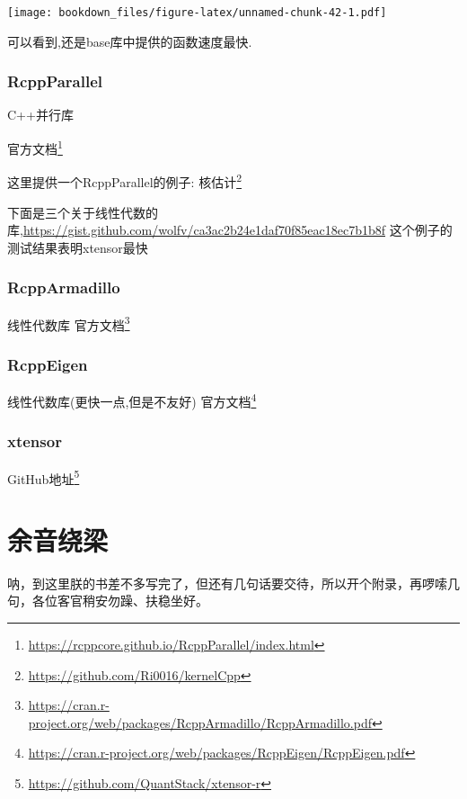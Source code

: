 \documentclass[]{ctexbook}
\renewcommand{\href}[2]{#2\footnote{\url{#1}}}
\begin{document}
\texttt{[image: bookdown\_files/figure-latex/unnamed-chunk-42-1.pdf]}

可以看到,还是base库中提供的函数速度最快.

\hypertarget{rcppparallel}{%
\subsection{RcppParallel}\label{rcppparallel}}

C++并行库

\href{https://rcppcore.github.io/RcppParallel/index.html}{官方文档}

这里提供一个RcppParallel的例子:
\href{https://github.com/Ri0016/kernelCpp}{核估计}

下面是三个关于线性代数的库,\url{https://gist.github.com/wolfv/ca3ac2b24e1daf70f85eac18ec7b1b8f}
这个例子的测试结果表明xtensor最快

\hypertarget{rcpparmadillo}{%
\subsection{RcppArmadillo}\label{rcpparmadillo}}

线性代数库
\href{https://cran.r-project.org/web/packages/RcppArmadillo/RcppArmadillo.pdf}{官方文档}

\hypertarget{rcppeigen}{%
\subsection{RcppEigen}\label{rcppeigen}}

线性代数库(更快一点,但是不友好)
\href{https://cran.r-project.org/web/packages/RcppEigen/RcppEigen.pdf}{官方文档}

\hypertarget{xtensor}{%
\subsection{xtensor}\label{xtensor}}

\href{https://github.com/QuantStack/xtensor-r}{GitHub地址}

\cleardoublepage

\hypertarget{appendix-}{%
\appendix {}}


\hypertarget{sound}{%
\chapter{余音绕梁}\label{sound}}

呐，到这里朕的书差不多写完了，但还有几句话要交待，所以开个附录，再啰嗦几句，各位客官稍安勿躁、扶稳坐好。



\backmatter
\printindex
\end{document}
